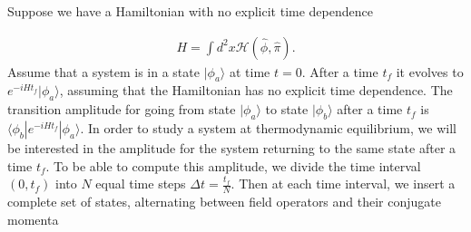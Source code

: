         Suppose we have a Hamiltonian with no explicit time dependence


        \begin{align}
            H = \int d^2x \mathcal{H}(\hat{\phi}, \hat{\pi}).
        \end{align}
        Assume that a system is in a state $| \phi_a \rangle$ at time $t=0$. After a time $t_f$ it evolves to $e^{-i H t_f} | \phi_a \rangle$, assuming that the Hamiltonian has no explicit time dependence. The transition amplitude for going from state $| \phi_a \rangle$ to state $| \phi_b \rangle$ after a time $t_f$ is $\langle \phi_b | e^{-i H t_f} | \phi_a \rangle$. In order to study a system at thermodynamic equilibrium, we will be interested in the amplitude for the system returning to the same state after a time $t_f$. To be able to compute this amplitude, we divide the time interval $(0, t_f)$ into $N$ equal time steps $\Delta t = \frac{t_f}{N}$. Then at each time interval, we insert a complete set of states, alternating between field operators and their conjugate momenta


